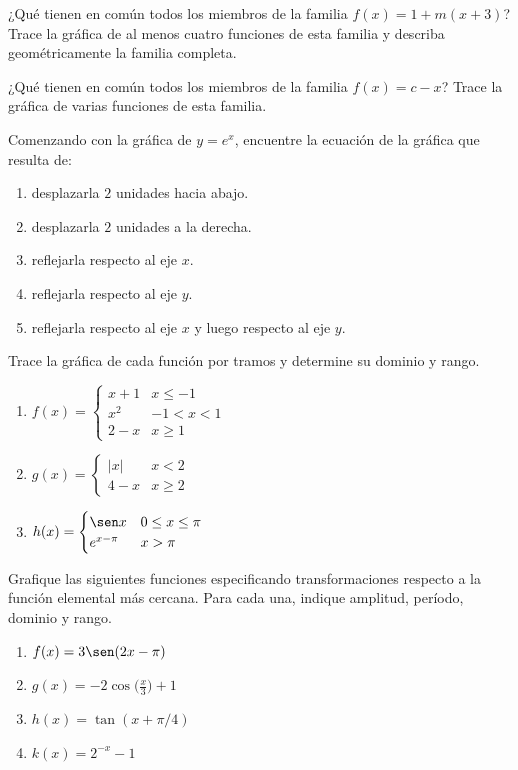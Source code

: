 \begin{prob}
¿Qué tienen en común todos los miembros de la familia $f(x) = 1 + m(x+3)$? Trace la gráfica de al menos cuatro funciones de esta familia y describa geométricamente la familia completa.
\end{prob}

\begin{prob}
¿Qué tienen en común todos los miembros de la familia $f(x) = c - x$? Trace la gráfica de varias funciones de esta familia.
\end{prob}

\begin{prob}
Comenzando con la gráfica de $y = e^x$, encuentre la ecuación de la gráfica que resulta de:
\begin{enumerate}
  \item desplazarla $2$ unidades hacia abajo.
  \item desplazarla $2$ unidades a la derecha.
  \item reflejarla respecto al eje $x$.
  \item reflejarla respecto al eje $y$.
  \item reflejarla respecto al eje $x$ y luego respecto al eje $y$.
\end{enumerate}
\end{prob}

\begin{prob}
Trace la gráfica de cada función por tramos y determine su dominio y rango.
\begin{enumerate}
  \item $f(x) = \begin{cases} x+1 & x \leq -1 \\ x^2 & -1 < x < 1 \\ 2-x & x \geq 1 \end{cases}$
  \item $g(x) = \begin{cases} |x| & x < 2 \\ 4-x & x \geq 2 \end{cases}$
  \item $h(x) = \begin{cases} \sen x & 0 \leq x \leq \pi \\ e^{x-\pi} & x > \pi \end{cases}$
\end{enumerate}
\end{prob}

\begin{prob}
Grafique las siguientes funciones especificando transformaciones respecto a la función elemental más cercana. Para cada una, indique amplitud, período, dominio y rango.
\begin{enumerate}
  \item $f(x) = 3\sen(2x - \pi)$
  \item $g(x) = -2\cos\!\bigl(\tfrac{x}{3}\bigr) + 1$
  \item $h(x) = \tan(x + \pi/4)$
  \item $k(x) = 2^{-x} - 1$
\end{enumerate}
\end{prob}


